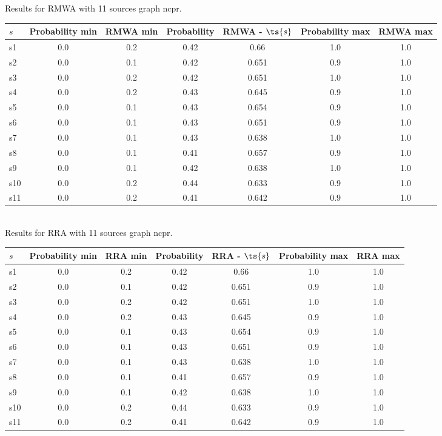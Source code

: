 \documentclass{article}
\begin{document}
\noindent Results for RMWA with 11 sources graph ncpr.

\noindent\begin{tabular}{|l|c|c|c|c|c|c|}
\hline
$s$& Probability min & RMWA min & Probability & RMWA - $\ts{s}$ & Probability max & RMWA max\\
\hline
s1 &0.0 & 0.2 & 0.42 & 0.66 & 1.0 & 1.0\\
\hline
s2 &0.0 & 0.1 & 0.42 & 0.651 & 0.9 & 1.0\\
\hline
s3 &0.0 & 0.2 & 0.42 & 0.651 & 1.0 & 1.0\\
\hline
s4 &0.0 & 0.2 & 0.43 & 0.645 & 0.9 & 1.0\\
\hline
s5 &0.0 & 0.1 & 0.43 & 0.654 & 0.9 & 1.0\\
\hline
s6 &0.0 & 0.1 & 0.43 & 0.651 & 0.9 & 1.0\\
\hline
s7 &0.0 & 0.1 & 0.43 & 0.638 & 1.0 & 1.0\\
\hline
s8 &0.0 & 0.1 & 0.41 & 0.657 & 0.9 & 1.0\\
\hline
s9 &0.0 & 0.1 & 0.42 & 0.638 & 1.0 & 1.0\\
\hline
s10 &0.0 & 0.2 & 0.44 & 0.633 & 0.9 & 1.0\\
\hline
s11 &0.0 & 0.2 & 0.41 & 0.642 & 0.9 & 1.0\\
\hline
\end{tabular}\\

\noindent Results for RRA with 11 sources graph ncpr.

\noindent\begin{tabular}{|l|c|c|c|c|c|c|}
\hline
$s$& Probability min & RRA min & Probability & RRA - $\ts{s}$ & Probability max & RRA max\\
\hline
s1 &0.0 & 0.2 & 0.42 & 0.66 & 1.0 & 1.0\\
\hline
s2 &0.0 & 0.1 & 0.42 & 0.651 & 0.9 & 1.0\\
\hline
s3 &0.0 & 0.2 & 0.42 & 0.651 & 1.0 & 1.0\\
\hline
s4 &0.0 & 0.2 & 0.43 & 0.645 & 0.9 & 1.0\\
\hline
s5 &0.0 & 0.1 & 0.43 & 0.654 & 0.9 & 1.0\\
\hline
s6 &0.0 & 0.1 & 0.43 & 0.651 & 0.9 & 1.0\\
\hline
s7 &0.0 & 0.1 & 0.43 & 0.638 & 1.0 & 1.0\\
\hline
s8 &0.0 & 0.1 & 0.41 & 0.657 & 0.9 & 1.0\\
\hline
s9 &0.0 & 0.1 & 0.42 & 0.638 & 1.0 & 1.0\\
\hline
s10 &0.0 & 0.2 & 0.44 & 0.633 & 0.9 & 1.0\\
\hline
s11 &0.0 & 0.2 & 0.41 & 0.642 & 0.9 & 1.0\\
\hline
\end{tabular}\\
\end{document}
